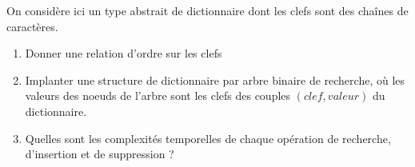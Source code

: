 \documentclass[../../../main.tex]{subfiles}
\begin{document}
On considère ici un type abstrait de dictionnaire dont les clefs sont des chaînes de caractères.
\begin{enumerate}
	\item Donner une relation d'ordre sur les clefs
	\item Implanter une structure de dictionnaire par arbre binaire de recherche, où les valeurs des noeuds de l'arbre sont les clefs des couples $(clef, valeur)$ du dictionnaire.
	\item Quelles sont les complexités temporelles de chaque opération de recherche, d'insertion et de suppression ?
\end{enumerate}




\end{document}
